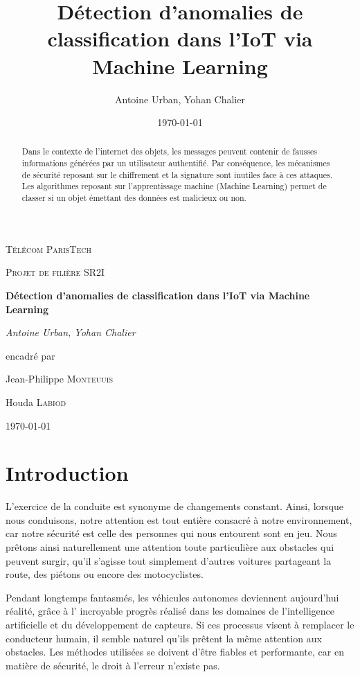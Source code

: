 \documentclass[a4paper]{report}
\title{Détection d'anomalies de classification dans l'IoT via Machine Learning}
\author{Antoine Urban, Yohan Chalier}
\date{\today}
\begin{document}
\begin{titlepage}
	\centering
	\vspace{1cm}
	{\scshape\LARGE Télécom ParisTech \par}
	\vspace{1cm}
	{\scshape\Large Projet de filière SR2I \par}
	\vspace{1.5cm}
	{\huge\bfseries Détection d'anomalies de classification dans l'IoT via Machine Learning\par}
	\vspace{2cm}
	{\Large\itshape Antoine Urban, Yohan Chalier \par}
	\vfill
	encadré par\par
	Jean-Philippe \textsc{Monteuuis}\par
	Houda \textsc{Labiod}
	\vfill

	{\large \today\par}
\end{titlepage}


\begin{abstract}
Dans le contexte de l'internet des objets, les messages peuvent contenir de fausses informations générées par un utilisateur authentifié. Par conséquence, les mécanismes de sécurité reposant sur le chiffrement et la signature sont inutiles face à ces attaques. Les algorithmes reposant sur l'apprentissage machine (Machine Learning) permet de classer si un objet  émettant des données est malicieux ou non. 
\end{abstract}

\chapter{Introduction}

L'exercice de la conduite est synonyme de changements constant. Ainsi, lorsque nous conduisons, notre attention est tout entière consacré à notre environnement, car notre sécurité est celle des personnes qui nous entourent sont en jeu. Nous prêtons ainsi naturellement une attention toute particulière aux obstacles qui peuvent surgir, qu'il s'agisse tout simplement d'autres voitures partageant la route, des piétons ou encore des motocyclistes. 

Pendant longtemps fantasmés, les véhicules autonomes deviennent aujourd'hui réalité, grâce à l' incroyable progrès réalisé dans les domaines de l'intelligence artificielle et du développement de capteurs. Si ces processus visent à remplacer le conducteur humain, il semble naturel qu'ils prêtent la même attention aux obstacles. Les méthodes utilisées se doivent d'être fiables et performante, car en matière de sécurité, le droit à l'erreur n'existe pas.
\end{document}
